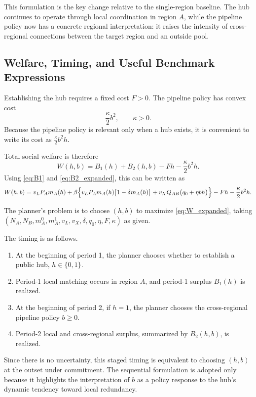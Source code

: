This formulation is the key change relative to the single-region baseline. The hub continues to operate through local coordination in region $A$, while the pipeline policy now has a concrete regional interpretation: it raises the intensity of cross-regional connections between the target region and an outside pool.

\subsection{Welfare, Timing, and Useful Benchmark Expressions}

Establishing the hub requires a fixed cost $F>0$. The pipeline policy has convex cost
\[
\frac{\kappa}{2}b^2,
\qquad
\kappa>0.
\]
Because the pipeline policy is relevant only when a hub exists, it is convenient to write its cost as $\frac{\kappa}{2}b^2 h$.

Total social welfare is therefore
\begin{equation}
W(h,b)
=
B_1(h)+B_2(h,b)-Fh-\frac{\kappa}{2}b^2 h.
\label{eq:W_general}
\end{equation}
Using \eqref{eq:B1} and \eqref{eq:B2_expanded}, this can be written as
\begin{equation}
W(h,b)
=
v_L P_A m_A(h)
+
\beta\Bigl\{v_L P_A m_A(h)\bigl[1-\delta m_A(h)\bigr] + v_X Q_{AB}\bigl(q_0+\eta b h\bigr)\Bigr\}
-Fh-\frac{\kappa}{2}b^2 h.
\label{eq:W_expanded}
\end{equation}

The planner's problem is to choose $(h,b)$ to maximize \eqref{eq:W_expanded}, taking $(N_A,N_B,m_A^0,m_A^1,v_L,v_X,\delta,q_0,\eta,F,\kappa)$ as given.

The timing is as follows.

\begin{enumerate}[leftmargin=2em]
    \item At the beginning of period 1, the planner chooses whether to establish a public hub, $h\in\{0,1\}$.
    \item Period-1 local matching occurs in region $A$, and period-1 surplus $B_1(h)$ is realized.
    \item At the beginning of period 2, if $h=1$, the planner chooses the cross-regional pipeline policy $b\ge 0$.
    \item Period-2 local and cross-regional surplus, summarized by $B_2(h,b)$, is realized.
\end{enumerate}

Since there is no uncertainty, this staged timing is equivalent to choosing $(h,b)$ at the outset under commitment. The sequential formulation is adopted only because it highlights the interpretation of $b$ as a policy response to the hub's dynamic tendency toward local redundancy.

